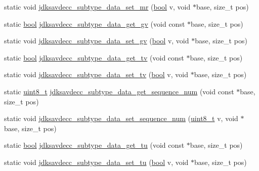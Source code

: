 \begin{DoxyCompactItemize}
\item 
static void \hyperlink{group__jdksavdecc__subtype__data_ga533cc4215b906399d9a4361b0a448667}{jdksavdecc\+\_\+subtype\+\_\+data\+\_\+set\+\_\+mr} (\hyperlink{avb__gptp_8h_af6a258d8f3ee5206d682d799316314b1}{bool} v, void $\ast$base, size\+\_\+t pos)
\item 
static \hyperlink{avb__gptp_8h_af6a258d8f3ee5206d682d799316314b1}{bool} \hyperlink{group__jdksavdecc__subtype__data_gaa906f78492f73d3d5fb63488ce8514a2}{jdksavdecc\+\_\+subtype\+\_\+data\+\_\+get\+\_\+gv} (void const $\ast$base, size\+\_\+t pos)
\item 
static void \hyperlink{group__jdksavdecc__subtype__data_ga21026c065956a549e8304582a6733dc6}{jdksavdecc\+\_\+subtype\+\_\+data\+\_\+set\+\_\+gv} (\hyperlink{avb__gptp_8h_af6a258d8f3ee5206d682d799316314b1}{bool} v, void $\ast$base, size\+\_\+t pos)
\item 
static \hyperlink{avb__gptp_8h_af6a258d8f3ee5206d682d799316314b1}{bool} \hyperlink{group__jdksavdecc__subtype__data_gac1500051787df0ee704e8b4b433b82a1}{jdksavdecc\+\_\+subtype\+\_\+data\+\_\+get\+\_\+tv} (void const $\ast$base, size\+\_\+t pos)
\item 
static void \hyperlink{group__jdksavdecc__subtype__data_ga8deff64594f5a718ba9fa101727c6fee}{jdksavdecc\+\_\+subtype\+\_\+data\+\_\+set\+\_\+tv} (\hyperlink{avb__gptp_8h_af6a258d8f3ee5206d682d799316314b1}{bool} v, void $\ast$base, size\+\_\+t pos)
\item 
static \hyperlink{stdint_8h_aba7bc1797add20fe3efdf37ced1182c5}{uint8\+\_\+t} \hyperlink{group__jdksavdecc__subtype__data_ga2bf15c1640c814d5194dfe6bfa8ac847}{jdksavdecc\+\_\+subtype\+\_\+data\+\_\+get\+\_\+sequence\+\_\+num} (void const $\ast$base, size\+\_\+t pos)
\item 
static void \hyperlink{group__jdksavdecc__subtype__data_gada3405962cdc4e7e99e31330f320c4b1}{jdksavdecc\+\_\+subtype\+\_\+data\+\_\+set\+\_\+sequence\+\_\+num} (\hyperlink{stdint_8h_aba7bc1797add20fe3efdf37ced1182c5}{uint8\+\_\+t} v, void $\ast$base, size\+\_\+t pos)
\item 
static \hyperlink{avb__gptp_8h_af6a258d8f3ee5206d682d799316314b1}{bool} \hyperlink{group__jdksavdecc__subtype__data_ga1f34053654a2a0a7007fd4965a2d2896}{jdksavdecc\+\_\+subtype\+\_\+data\+\_\+get\+\_\+tu} (void const $\ast$base, size\+\_\+t pos)
\item 
static void \hyperlink{group__jdksavdecc__subtype__data_gabe35dfb37cedacac764204418f798be5}{jdksavdecc\+\_\+subtype\+\_\+data\+\_\+set\+\_\+tu} (\hyperlink{avb__gptp_8h_af6a258d8f3ee5206d682d799316314b1}{bool} v, void $\ast$base, size\+\_\+t pos)
\end{DoxyCompactItemize}


